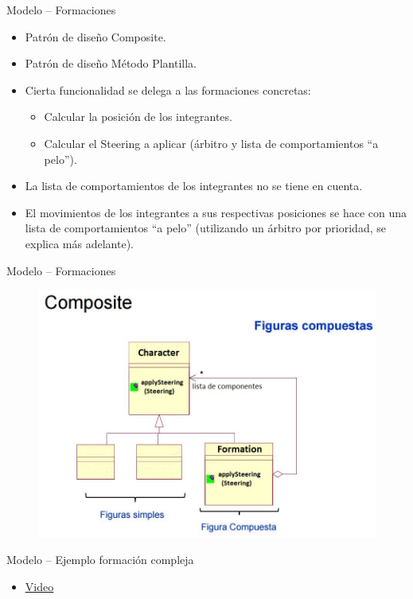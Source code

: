 \documentclass[10pt]{beamer}
\begin{document}
\begin{frame}{Modelo -- Formaciones}
\begin{itemize}[<+- | alert@+>]
	\item Patrón de diseño Composite.
	\item Patrón de diseño Método Plantilla.
	\item Cierta funcionalidad se delega a las formaciones concretas:
	\begin{itemize}
	 \item Calcular la posición de los integrantes.
	 \item Calcular el Steering a aplicar (árbitro y lista de comportamientos ``a pelo'').
	\end{itemize}

	\item La lista de comportamientos de los integrantes no se tiene en cuenta.
	\item El movimientos de los integrantes a sus respectivas posiciones se hace con una lista de comportamientos ``a pelo'' (utilizando un árbitro por prioridad, se explica más adelante).
 \end{itemize}
\end{frame}

\begin{frame}{Modelo -- Formaciones}
\begin{figure}[!th]
 \includegraphics[scale=0.38]{images/composite}
\end{figure}
\end{frame}

\begin{frame}{Modelo -- Ejemplo formación compleja}
\begin{itemize}
 \item \href{videos/TestComplexFormation.mp4}{\color{blue}\underline{Video}} 
\end{itemize}
\end{frame}
\end{document}
